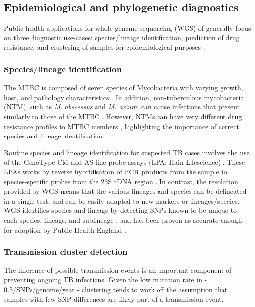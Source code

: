 \subsection{Epidemiological and phylogenetic diagnostics}
Public health applications for whole genome sequencing (WGS) of \mtb{} generally focus on three diagnostic use-cases: species/lineage identification, prediction of drug resistance, and clustering of samples for epidemiological purposes \cite{Gordon2021,Meehan2019}.

\subsubsection{Species/lineage identification}
The MTBC is composed of seven species of Mycobacteria with varying growth, host, and pathology characteristics \cite{Homolka2012}. In addition, non-tuberculous mycobacteria (NTM), such as \textit{M. abscessus} and \textit{M. avium}, can cause infections that present similarly to those of the MTBC \cite{Johansen2020}. However, NTMs can have very different drug resistance profiles to MTBC members \cite{Floto2016,Johansen2020}, highlighting the importance of correct species and lineage identification.

Routine species and lineage identification for suspected TB cases involves the use of the GenoType CM and AS line probe assays (LPA; Hain Lifescience) \cite{Makinen2006,Quan2018}. These LPAs works by reverse hybridisation of PCR products from the sample to species-specific probes from the 23S rDNA region \cite{Makinen2006}. In contrast, the resolution provided by WGS means that the various lineages and species can be delineated in a single test, and can be easily adapted to new markers or lineages/species. WGS identifies species and lineage by detecting SNPs known to be unique to each species, lineage, and sublineage \cite{Coll2014,Homolka2012,Stucki2016standard,Lipworth2019,Freschi2020}, and has been proven as accurate enough for adoption by Public Health England \cite{Quan2018}.

\subsubsection{Transmission cluster detection}
The inference of possible transmission events is an important component of preventing ongoing TB infections. Given the low mutation rate in \mtb{} - 0.5/SNPs/genome/year \cite{walker2013} - clustering tends to work off the assumption that samples with few SNP differences are likely part of a transmission event. 

